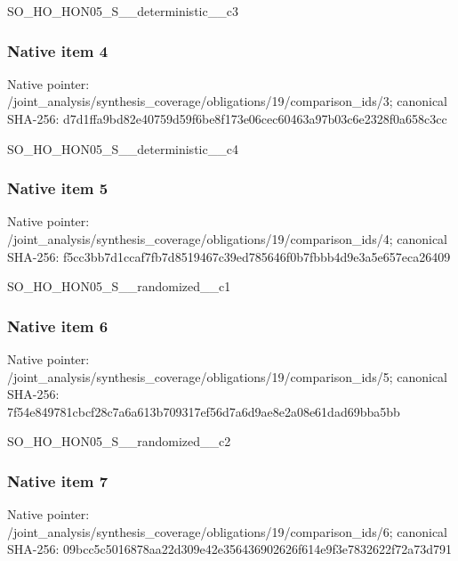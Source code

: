 \documentclass[10pt,a4paper]{article}
\begin{document}
\begingroup\raggedright\sloppy SO\_\allowbreak{}HO\_\allowbreak{}HON05\_\allowbreak{}S\_\allowbreak{}\_\allowbreak{}deterministic\_\allowbreak{}\_\allowbreak{}c3\par\endgroup

\subsubsection{Native item 4}
Native pointer: /joint\_\allowbreak{}analysis/synthesis\_\allowbreak{}coverage/obligations/19/comparison\_\allowbreak{}ids/3; canonical SHA-256: d7d1ffa9bd82e40759d59f6be8f173e06cec60463a97b03c6e2328f0a658c3cc

\begingroup\raggedright\sloppy SO\_\allowbreak{}HO\_\allowbreak{}HON05\_\allowbreak{}S\_\allowbreak{}\_\allowbreak{}deterministic\_\allowbreak{}\_\allowbreak{}c4\par\endgroup

\subsubsection{Native item 5}
Native pointer: /joint\_\allowbreak{}analysis/synthesis\_\allowbreak{}coverage/obligations/19/comparison\_\allowbreak{}ids/4; canonical SHA-256: f5cc3bb7d1ccaf7fb7d8519467c39ed785646f0b7fbbb4d9e3a5e657eca26409

\begingroup\raggedright\sloppy SO\_\allowbreak{}HO\_\allowbreak{}HON05\_\allowbreak{}S\_\allowbreak{}\_\allowbreak{}randomized\_\allowbreak{}\_\allowbreak{}c1\par\endgroup

\subsubsection{Native item 6}
Native pointer: /joint\_\allowbreak{}analysis/synthesis\_\allowbreak{}coverage/obligations/19/comparison\_\allowbreak{}ids/5; canonical SHA-256: 7f54e849781cbcf28c7a6a613b709317ef56d7a6d9ae8e2a08e61dad69bba5bb

\begingroup\raggedright\sloppy SO\_\allowbreak{}HO\_\allowbreak{}HON05\_\allowbreak{}S\_\allowbreak{}\_\allowbreak{}randomized\_\allowbreak{}\_\allowbreak{}c2\par\endgroup

\subsubsection{Native item 7}
Native pointer: /joint\_\allowbreak{}analysis/synthesis\_\allowbreak{}coverage/obligations/19/comparison\_\allowbreak{}ids/6; canonical SHA-256: 09bcc5c5016878aa22d309e42e356436902626f614e9f3e7832622f72a73d791
\end{document}
